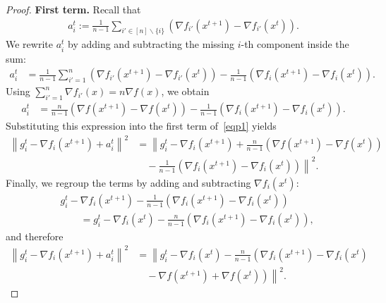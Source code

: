 \documentclass{article}
\newcommand{\sqn}[1]{\left\| #1 \right\|^2}
\newcommand{\eqdef}{:=}
\theoremstyle{plain}
\begin{document}
\begin{proof}
\textbf{First term.}
Recall that
\begin{align*}
a_i^{t}\eqdef \frac{1}{n-1}\sum_{i'\in [n]\backslash\{i\}} \left(\nabla f_{i'}(x^{t+1})-\nabla f_{i'}(x^{t})\right).
\end{align*}
We rewrite $a_i^t$ by adding and subtracting the missing $i$-th component inside the sum:
\begin{align*}
a_i^t
&=\frac{1}{n-1}\sum_{i'=1}^n\left(\nabla f_{i'}(x^{t+1})-\nabla f_{i'}(x^{t})\right)
-\frac{1}{n-1}\left(\nabla f_{i}(x^{t+1})-\nabla f_{i}(x^{t})\right).
\end{align*}
Using $\sum_{i'=1}^n \nabla f_{i'}(x)=n\nabla f(x)$, we obtain
\begin{align*}
a_i^t
&=\frac{n}{n-1}\left(\nabla f(x^{t+1})-\nabla f(x^{t})\right)
-\frac{1}{n-1}\left(\nabla f_{i}(x^{t+1})-\nabla f_{i}(x^{t})\right).
\end{align*}
Substituting this expression into the first term of~\eqref{eqp1} yields
\begin{align*}
\sqn{g_i^{t}-\nabla f_i(x^{t+1})+a_i^t}
&=\left\| g_i^{t}-\nabla f_i(x^{t+1})
+\frac{n}{n-1}\left(\nabla f(x^{t+1})-\nabla f(x^{t})\right)\right.\\
&\quad\left.{}-\frac{1}{n-1}\left(\nabla f_{i}(x^{t+1})-\nabla f_{i}(x^{t})\right)\right\|^2.
\end{align*}
Finally, we regroup the terms by adding and subtracting $\nabla f_i(x^t)$:
\begin{align*}
&g_i^{t}-\nabla f_i(x^{t+1})
-\frac{1}{n-1}\left(\nabla f_{i}(x^{t+1})-\nabla f_{i}(x^{t})\right)\\
&\qquad = g_i^{t}-\nabla f_i(x^{t})
-\frac{n}{n-1}\left(\nabla f_{i}(x^{t+1})-\nabla f_{i}(x^{t})\right),
\end{align*}
and therefore
\begin{align*}
\sqn{g_i^{t}-\nabla f_i(x^{t+1})+a_i^t}
&=\left\| g_i^{t}-\nabla f_i(x^{t})
-\frac{n}{n-1}\left(\nabla f_{i}(x^{t+1})-\nabla f_{i}(x^{t})\right.\right.\\
&\quad\left.\left.{}-\nabla f(x^{t+1})+\nabla f(x^{t})\right)\right\|^2.
\end{align*}


\end{proof}
\end{document}

